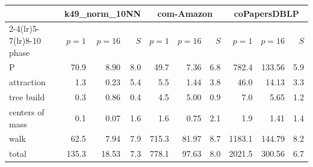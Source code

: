 \begin{tabular}{l r r r r r r r r r}
\toprule
 & \multicolumn{3}{c}{k49\_norm\_10NN} & \multicolumn{3}{c}{com-Amazon} & \multicolumn{3}{c}{coPapersDBLP}\\
\cmidrule(lr){2-4}\cmidrule(lr){5-7}\cmidrule(lr){8-10}
phase & $p{=}1$ & $p{=}16$ & $S$ & $p{=}1$ & $p{=}16$ & $S$ & $p{=}1$ & $p{=}16$ & $S$\\
\midrule
P & 70.9 & 8.90 & 8.0 & 49.7 & 7.36 & 6.8 & 782.4 & 133.56 & 5.9\\
attraction & 1.3 & 0.23 & 5.4 & 5.5 & 1.44 & 3.8 & 46.0 & 14.13 & 3.3\\
tree build & 0.3 & 0.86 & 0.4 & 4.5 & 5.00 & 0.9 & 7.0 & 5.65 & 1.2\\
centers of mass & 0.1 & 0.07 & 1.6 & 1.6 & 0.75 & 2.1 & 1.9 & 1.41 & 1.4\\
walk & 62.5 & 7.94 & 7.9 & 715.3 & 81.97 & 8.7 & 1183.1 & 144.79 & 8.2\\
\midrule
total & 135.3 & 18.53 & 7.3 & 778.1 & 97.63 & 8.0 & 2021.5 & 300.56 & 6.7\\
\bottomrule
\end{tabular}
